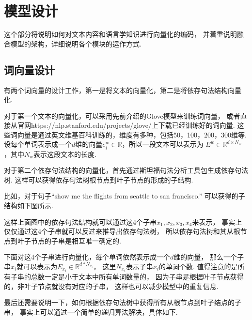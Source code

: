 \documentclass[bachelor,adobefonts]{jnuthesis}
\begin{document}
\section{模型设计}
这个部分将说明如何对文本内容和语言学知识进行向量化的编码，
并着重说明融合模型的架构，详细说明各个模块的运作方式.
\subsection{词向量设计}
有两个词向量的设计工作，第一是将文本的向量化，第二是将依存句法结构向量化.

对于第一个文本的向量化，可以采用先前介绍的Glove模型来训练词向量，
或者直接从官网https://nlp.stanford.edu/projects/glove/上下载已经训练好的词向量.
这些词向量是通过英文维基百科训练的，维度有多种，包括50，100，200，300维等.
设每个单词表示成一个$d$维的向量$e_{i}^{w} \in \mathbb{R}$，所以一段文本可以表示为
$E^{w} \in \mathbb{R}^{d \times N_{w}}$，其中$N_{w}$表示这段文本的长度.

对于第二个依存句法结构的向量化，首先通过斯坦福句法分析工具包生成依存句法树.
这样可以获得依存句法树根节点到叶子节点的形成的子结构.

比如，对于句子“show me the flights from seattle to san francisco.”
可以获得的子结构如下图所示.


这样上面图中的依存句法结构就可以通过这4个子串$x_{1},x_{2},x_{3},x_{4}$来表示，
事实上仅仅通过这4个子串就可以反过来推导出依存句法树，
所以依存句法树和其从根节点到叶子节点的子串是相互唯一确定的.

下面对这4个子串进行向量化，每个单词依然表示成一个$d$维的向量，
那么一个子串$x_{i}$就可以表示为$E_{x_{i}} \in \mathbb{R}^{d*N_{x_{i}}}$，
这里$N_{x_{i}}$表示子串$x_{i}$的单词个数.
值得注意的是所有子串的总数一定是小于文本中所有单词数量的，
因为子串是根据叶子节点获得的，非叶子节点就没有对应的子串，
这样也可以减少模型中的重复信息.

最后还需要说明一下，如何根据依存句法树中获得所有从根节点到叶子结点的子串，
事实上可以通过一个简单的递归算法解决，具体如下.
\end{document}
